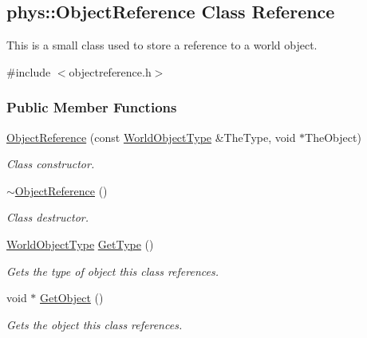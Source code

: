 \hypertarget{classphys_1_1ObjectReference}{
\subsection{phys::ObjectReference Class Reference}
\label{classphys_1_1ObjectReference}
}


This is a small class used to store a reference to a world object.  




{\ttfamily \#include $<$objectreference.h$>$}

\subsubsection*{Public Member Functions}
\begin{DoxyCompactItemize}
\item 
\hyperlink{classphys_1_1ObjectReference_aa97733aef863b81f9fdbb4455d60d7e9}{ObjectReference} (const \hyperlink{namespacephys_a56410935e1c614a932dbc91ee7330df1}{WorldObjectType} \&TheType, void $\ast$TheObject)
\begin{DoxyCompactList}\small\item\em Class constructor. \item\end{DoxyCompactList}\item 
\hypertarget{classphys_1_1ObjectReference_ae0205396bc65406316730a6cd5bdc237}{
\hyperlink{classphys_1_1ObjectReference_ae0205396bc65406316730a6cd5bdc237}{$\sim$ObjectReference} ()}
\label{classphys_1_1ObjectReference_ae0205396bc65406316730a6cd5bdc237}

\begin{DoxyCompactList}\small\item\em Class destructor. \item\end{DoxyCompactList}\item 
\hyperlink{namespacephys_a56410935e1c614a932dbc91ee7330df1}{WorldObjectType} \hyperlink{classphys_1_1ObjectReference_aea70ac457331e5b20a7487e2d93ba005}{GetType} ()
\begin{DoxyCompactList}\small\item\em Gets the type of object this class references. \item\end{DoxyCompactList}\item 
void $\ast$ \hyperlink{classphys_1_1ObjectReference_a729c6e6b0ec5f0bbc7eb19987235729e}{GetObject} ()
\begin{DoxyCompactList}\small\item\em Gets the object this class references. \item\end{DoxyCompactList}\end{DoxyCompactItemize}
